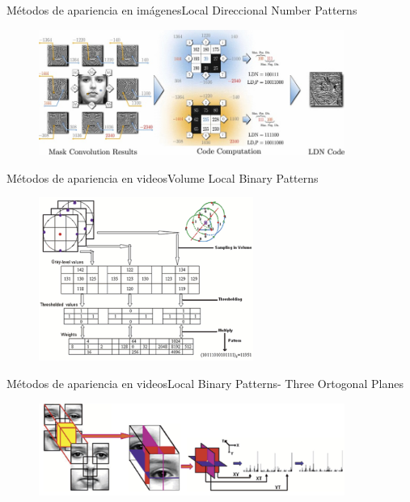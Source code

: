 \documentclass{beamer}
\begin{document}
        \begin{frame}{Métodos de apariencia en imágenes}{Local Direccional Number Patterns}
            \begin{figure}[bt]
        		\centering
                \includegraphics[width=10cm]{imagenes/ldn.jpg}
            \end{figure}
        \end{frame}
        
        
        \begin{frame}{Métodos de apariencia en videos}{Volume Local Binary Patterns}
            \begin{figure}[bt]
        		\centering
                \includegraphics[width=7cm]{imagenes/vlbp.pdf}
            \end{figure}
        \end{frame}
    
        
        \begin{frame}{Métodos de apariencia en videos}{Local Binary Patterns- Three Ortogonal Planes}
            \begin{figure}[bt]
        		\centering
                \includegraphics[width=10cm]{imagenes/lbptop.pdf}
            \end{figure}
        \end{frame}
    
\end{document}

